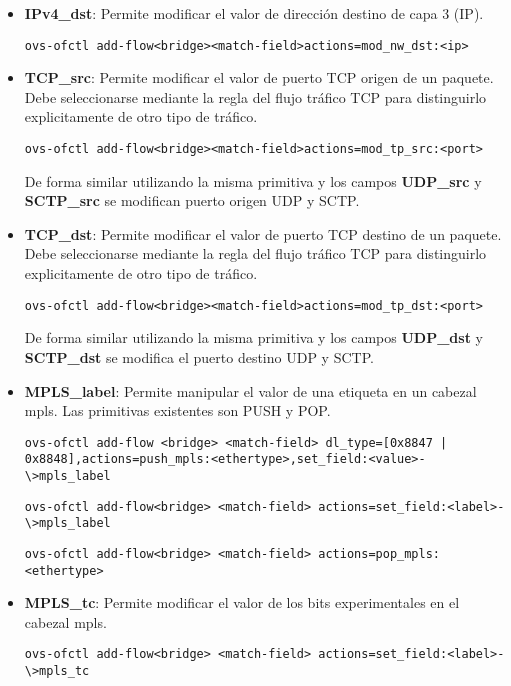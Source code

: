 \begin{itemize}
\item \textbf{IPv4\_dst}: Permite modificar el valor de direcci\'on destino de capa 3 (IP).

\begin{center}
\texttt{ovs-ofctl add-flow<bridge><match-field>actions=mod\_nw\_dst:<ip>}
\end{center}


\item \textbf{TCP\_src}: Permite modificar el valor de puerto TCP origen de un paquete. Debe seleccionarse mediante la regla del flujo tr\'afico TCP para distinguirlo explicitamente de otro tipo de tr\'afico. 

\begin{center}
\texttt{ovs-ofctl add-flow<bridge><match-field>actions=mod\_tp\_src:<port>}
\end{center}

De forma similar utilizando la misma primitiva y los campos \textbf{UDP\_src} y \textbf{SCTP\_src} se modifican puerto origen UDP y SCTP.

\item \textbf{TCP\_dst}: Permite modificar el valor de puerto TCP destino de un paquete. Debe seleccionarse mediante la regla del flujo tr\'afico TCP para distinguirlo explicitamente de otro tipo de tr\'afico. 

\begin{center}
\texttt{ovs-ofctl add-flow<bridge><match-field>actions=mod\_tp\_dst:<port>}
\end{center}
            
De forma similar utilizando la misma primitiva y los campos \textbf{UDP\_dst} y \textbf{SCTP\_dst} se modifica el puerto destino UDP y SCTP. 
                
\item \textbf{MPLS\_label}: Permite manipular el valor de una etiqueta en un cabezal mpls. Las primitivas existentes son PUSH y POP.

\begin{center}
\texttt{ovs-ofctl add-flow <bridge> <match-field> dl\_type=[0x8847 | 0x8848],actions=push\_mpls:<ethertype>,set\_field:<value>-\textbackslash >mpls\_label}
\end{center}

\begin{center}
\texttt{ovs-ofctl add-flow<bridge> <match-field> actions=set\_field:<label>-\textbackslash >mpls\_label}
\end{center}
 
\begin{center}
\texttt{ovs-ofctl add-flow<bridge> <match-field> actions=pop\_mpls:<ethertype>}
\end{center}

\item \textbf{MPLS\_tc}: Permite modificar el valor de los bits experimentales en el cabezal mpls.

\begin{center}
\texttt{ovs-ofctl add-flow<bridge> <match-field> actions=set\_field:<label>-\textbackslash >mpls\_tc}
\end{center}

\end{itemize}
